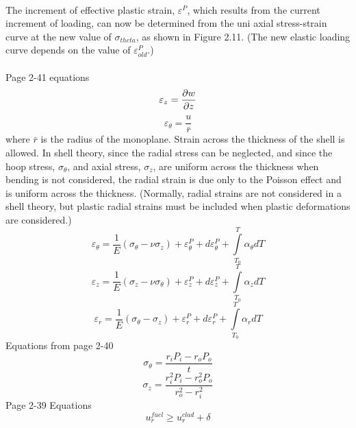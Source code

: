 \documentclass[12pt]{article}
\begin{document}
\\
The increment of effective plastic strain, $\varepsilon^P$, which results from the current increment of loading, can now be determined from the uni axial stress-strain curve at the new value of $\sigma_{theta}$, as shown in Figure 2.11. (The new elastic loading curve depends on the value of $\varepsilon_{old}^P$.)\\
\\
Page 2-41 equations
\begin{equation}
\varepsilon_z = \pdv{w}{z}
\end{equation}
\begin{equation}
\varepsilon_{\theta} = \frac{u}{\bar{r}}
\end{equation}
where $\bar{r}$ is the radius of the monoplane. Strain across the thickness of the shell is allowed. In shell theory, since the radial stress can be neglected, and since the hoop stress, $\sigma_{\theta}$, and axial stress, $\sigma_{z}$, are uniform across the thickness when bending is not considered, the radial strain is due only to the Poisson effect and is uniform across the thickness. (Normally, radial strains are not considered in a shell theory, but plastic radial strains must be included when plastic deformations are considered.)  
\begin{equation}
\varepsilon_{\theta}=\frac{1}{E} \left(\sigma_{\theta}-\nu\sigma_{z} \right)+\varepsilon_{\theta}^P+d\varepsilon_{\theta}^P+\int\limits_{T_0}^T\alpha_{\theta}dT
\end{equation}
\begin{equation}
\varepsilon_{z}=\frac{1}{E} \left(\sigma_{z}-\nu\sigma_{\theta} \right)+\varepsilon_{z}^P+d\varepsilon_{z}^P+\int\limits_{T_0}^T\alpha_{z}dT
\end{equation}
\begin{equation}
\varepsilon_r=\frac{1}{E} \left(\sigma_{\theta}-\sigma_{z} \right)+\varepsilon_{r}^P+d\varepsilon_{r}^P+\int\limits_{T_0}^T\alpha_{r}dT
\end{equation}
Equations from page 2-40
\begin{equation}
\sigma_{\theta}=\frac{r_{i}P_{i}-r_{o}P_{o}}{t}
\end{equation}
\begin{equation}
\sigma_{z}=\frac{r_{i}^{2}P_{i}-r_{o}^{2}P_{o}}{r_{o}^{2}-r_{i}^{2}}
\end{equation}
Page 2-39 Equations
\begin{equation}
u_r^{fuel} \geq u_r^{clad}+\delta
\end{equation}
\end{document}
